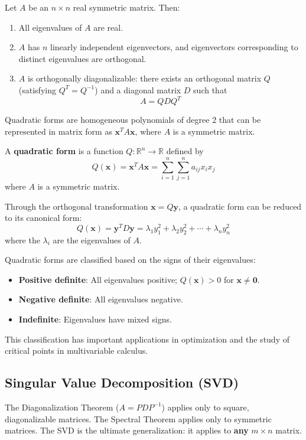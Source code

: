 \documentclass[oneside]{book}
\begin{document}
\begin{theorem}
Let $A$ be an $n \times n$ real symmetric matrix. Then:
\begin{enumerate}
    \item All eigenvalues of $A$ are real.
    \item $A$ has $n$ linearly independent eigenvectors, and eigenvectors corresponding to distinct eigenvalues are orthogonal.
    \item $A$ is orthogonally diagonalizable: there exists an orthogonal matrix $Q$ (satisfying $Q^T = Q^{-1}$) and a diagonal matrix $D$ such that
    \[
    A = QDQ^T
    \]
\end{enumerate}
\end{theorem}

Quadratic forms are homogeneous polynomials of degree 2 that can be represented in matrix form as $\mathbf{x}^T A \mathbf{x}$, where $A$ is a symmetric matrix.

\begin{definition}
A \textbf{quadratic form} is a function $Q: \mathbb{R}^n \to \mathbb{R}$ defined by
\[
Q(\mathbf{x}) = \mathbf{x}^T A \mathbf{x} = \sum_{i=1}^n \sum_{j=1}^n a_{ij} x_i x_j
\]
where $A$ is a symmetric matrix.
\end{definition}

Through the orthogonal transformation $\mathbf{x} = Q\mathbf{y}$, a quadratic form can be reduced to its canonical form:
\[
Q(\mathbf{x}) = \mathbf{y}^T D \mathbf{y} = \lambda_1 y_1^2 + \lambda_2 y_2^2 + \cdots + \lambda_n y_n^2
\]
where the $\lambda_i$ are the eigenvalues of $A$.

Quadratic forms are classified based on the signs of their eigenvalues:
\begin{itemize}
    \item \textbf{Positive definite}: All eigenvalues positive; $Q(\mathbf{x}) > 0$ for $\mathbf{x} \neq \mathbf{0}$.
    \item \textbf{Negative definite}: All eigenvalues negative.
    \item \textbf{Indefinite}: Eigenvalues have mixed signs.
\end{itemize}

This classification has important applications in optimization and the study of critical points in multivariable calculus.

\newpage

\subsection{Singular Value Decomposition (SVD)}
The Diagonalization Theorem ($A = PDP^{-1}$) applies only to square, diagonalizable matrices. The Spectral Theorem applies only to symmetric matrices. The SVD is the ultimate generalization: it applies to \textbf{any} $m \times n$ matrix.
\end{document}
